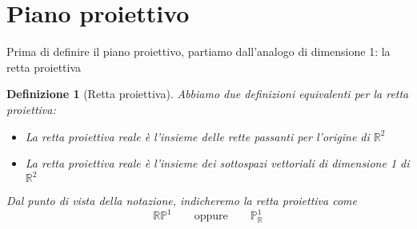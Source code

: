 \documentclass[a4paper]{report}
\newtheorem{definition}{Definizione}
\newcommand{\R}{\ensuremath{\mathbb{R}}}
\begin{document}
\section{Piano proiettivo}
Prima di definire il piano proiettivo, partiamo dall'analogo di dimensione 1: la retta proiettiva
\begin{definition}[Retta proiettiva]
    Abbiamo due definizioni equivalenti per la retta proiettiva:
    \begin{itemize}
        \item La retta proiettiva reale è l'insieme delle rette passanti per l'origine di $\R^2$
        \item La retta proiettiva reale è l'insieme dei sottospazi vettoriali di dimensione 1 di $\R^2$
    \end{itemize}
    Dal punto di vista della notazione, indicheremo la retta proiettiva come
    \[
        \R\mathbb{P}^1\quad\quad\text{oppure}\quad\quad\mathbb{P}_\R^1
    \]
\end{definition}
\end{document}
